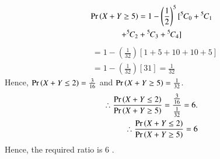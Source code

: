 \begin{multline}
\Pr\left(X + Y \geq 5\right) = 1 - \left(\frac{1}{2}\right)^{5} [{{}^{5}\mkern-1muC_{0}} + {{}^{5}\mkern-1muC_{1}} \\ + {{}^{5}\mkern-1muC_{2}} + {{}^{5}\mkern-1muC_{3}} + {{}^{5}\mkern-1muC_{4}}]    
\end{multline}
\begin{align}
&= 1 - \left(\frac{1}{32}\right)\left[1 + 5 + 10 + 10 + 5 \right] \\
&= 1- \left(\frac{1}{32}\right)\left[31 \right] = \frac{1}{32}
\end{align}
Hence,
$\Pr\left(X + Y \leq 2\right) = \frac{3}{16}$ and $\Pr\left(X + Y \geq 5\right) = \frac{1}{32}$.
\begin{align*}
\therefore \frac{\Pr\left(X + Y \leq 2\right)}{\Pr\left(X + Y \geq 5\right)} = \frac{\frac{3}{16}}{\frac{1}{32}} = 6. \\
\therefore \frac{\Pr\left(X + Y \leq 2\right)}{\Pr\left(X + Y \geq 5\right)} = 6    
\end{align*}
Hence, the required ratio is 6 .